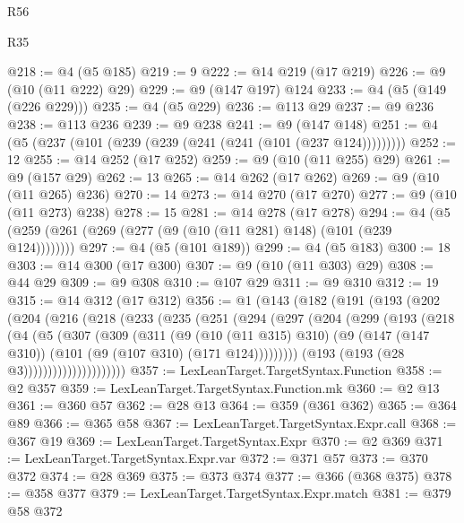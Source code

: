 \begin{lexlean}{R56}
\begin{lexlean}{R35}
\begin{coremodule}
{{{{{{{{{{{{{{{{{{{{{{{{{{{{{{{{{{{{{{{{{{{{{{{{{{{{@218 := @4 (@5 @185)
@219 := 9
@222 := @14 @219 (@17 @219)
@226 := @9 (@10 (@11 @222) @29)
@229 := @9 (@147 @197) @124
@233 := @4 (@5 (@149 (@226 @229)))
@235 := @4 (@5 @229)
@236 := @113 @29
@237 := @9 @236
@238 := @113 @236
@239 := @9 @238
@241 := @9 (@147 @148)
@251 := @4 (@5 (@237 (@101 (@239 (@239 (@241 (@241 (@101 (@237 @124)))))))))
@252 := 12
@255 := @14 @252 (@17 @252)
@259 := @9 (@10 (@11 @255) @29)
@261 := @9 (@157 @29)
@262 := 13
@265 := @14 @262 (@17 @262)
@269 := @9 (@10 (@11 @265) @236)
@270 := 14
@273 := @14 @270 (@17 @270)
@277 := @9 (@10 (@11 @273) @238)
@278 := 15
@281 := @14 @278 (@17 @278)
@294 := @4 (@5 (@259 (@261 (@269 (@277 (@9 (@10 (@11 @281) @148) (@101 (@239 @124))))))))
@297 := @4 (@5 (@101 @189))
@299 := @4 (@5 @183)
@300 := 18
@303 := @14 @300 (@17 @300)
@307 := @9 (@10 (@11 @303) @29)
@308 := @44 @29
@309 := @9 @308
@310 := @107 @29
@311 := @9 @310
@312 := 19
@315 := @14 @312 (@17 @312)
@356 := @1
    (@143
      (@182
        (@191
          (@193
            (@202
              (@204
                (@216
                  (@218
                    (@233
                      (@235
                        (@251
                          (@294
                            (@297
                              (@204
                                (@299
                                  (@193
                                    (@218
                                      (@4
                                        (@5
                                          (@307
                                            (@309
                                              (@311
                                                (@9
                                                  (@10 (@11 @315) @310)
                                                  (@9
                                                    (@147 (@147 @310))
                                                    (@101 (@9 (@107 @310) (@171 @124)))))))))
                                        (@193 (@193 (@28 @3)))))))))))))))))))))
@357 := LexLeanTarget.TargetSyntax.Function
@358 := @2 @357
@359 := LexLeanTarget.TargetSyntax.Function.mk
@360 := @2 @13
@361 := @360 @57
@362 := @28 @13
@364 := @359 (@361 @362)
@365 := @364 @89
@366 := @365 @58
@367 := LexLeanTarget.TargetSyntax.Expr.call
@368 := @367 @19
@369 := LexLeanTarget.TargetSyntax.Expr
@370 := @2 @369
@371 := LexLeanTarget.TargetSyntax.Expr.var
@372 := @371 @57
@373 := @370 @372
@374 := @28 @369
@375 := @373 @374
@377 := @366 (@368 @375)
@378 := @358 @377
@379 := LexLeanTarget.TargetSyntax.Expr.match
@381 := @379 @58 @372
}}}}}}}}}}}}}}}}}}}}}}}}}}}}}}}}}}}}}}}}}}}}}}}}}}}}
\end{coremodule}
\end{lexlean}
\end{lexlean}
